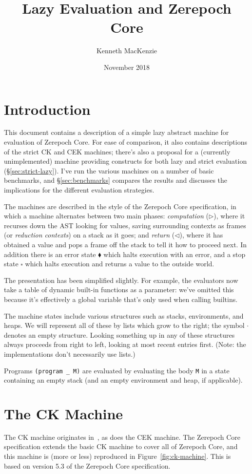 \documentclass[a4paper]{article}
\author{Kenneth MacKenzie}
\date{November 2018}
\title{Lazy Evaluation and Zerepoch Core}
\begin{document}
\maketitle
\section{Introduction}
This document contains a description of a simple lazy abstract machine
for evaluation of Zerepoch Core.  For ease of comparison, it also
contains descriptions of the strict CK and CEK machines; there's also
a proposal for a (currently unimplemented) machine providing
constructs for both lazy and strict evaluation
(\S\ref{sec:strict-lazy}).  I've run the various machines on a
number of basic benchmarks, and \S\ref{sec:benchmarks} compares
the results and discusses the implications for the different
evaluation strategies.

The machines are described in the style of the Zerepoch Core
specification, in which a machine alternates between two main phases:
\textit{computation} ($\triangleright$), where it recurses down the
AST looking for values, saving surrounding contexts as frames (or
\textit{reduction contexts}) on a stack as it goes; and
\textit{return} ($\triangleleft$), where it has obtained a value and
pops a frame off the stack to tell it how to proceed next.  In
addition there is an error state $\blacklozenge$ which halts execution
with an error, and a stop state $\square$ which halts execution and
returns a value to the outside world. 

The presentation has been simplified slightly. For example, the
evaluators now take a table of dynamic built-in functions as a
parameter: we've omitted this because it's effectively a global
variable that's only used when calling builtins.

The machine states include various structures such as stacks,
environments, and heaps.  We will represent all of these by lists
which grow to the right; the symbol $\cdot$ denotes an empty
structure.  Looking something up in any of these structures always
proceeds from right to left, looking at most recent entries first.
(Note: the implementations don't necessarily use lists.)

Programs \texttt{(program \_ M)} are evaluated by evaluating the body
\texttt{M} in a state containing an empty stack (and an empty environment
and heap, if applicable).
 


\section{The CK Machine}
The CK machine originates in~\cite{Felleisen-Cek}, as does the CEK
machine.  The Zerepoch Core specification extends the basic CK machine
to cover all of Zerepoch Core, and this machine is (more or less)
reproduced in Figure~\ref{fig:ck-machine}.  This is based on version
5.3 of the Zerepoch Core specification.
\end{document}
